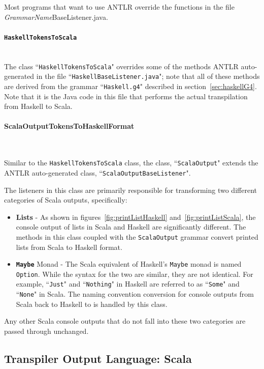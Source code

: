 \documentclass{report}
\newcommand{\myparagraph}[1]{\paragraph{#1}\mbox{}\\}
\begin{document}
Most programs that want to use ANTLR override the functions in the file \emph{GrammarName}BaseListener.java.


\myparagraph{\texttt{HaskellTokensToScala}}

The class ``\texttt{HaskellTokensToScala}" overrides some of the methods ANTLR auto-generated in the file ``\texttt{HaskellBaseListener.java}"; note that all of these methods are derived from the grammar ``\texttt{Haskell.g4}" described in section~\ref{sec:haskellG4}.  Note that it is the Java code in this file that performs the actual transpilation from Haskell to Scala.

\myparagraph{ScalaOutputTokensToHaskellFormat}\label{sec:scalaOutputFunctionality}

Similar to the \texttt{HaskellTokensToScala} class, the class, ``\texttt{ScalaOutput}" extends the ANTLR auto-generated class, ``\texttt{ScalaOutputBaseListener}".

The listeners in this class are primarily responsible for transforming two different categories of Scala outputs, specifically:

\begin{itemize}

\item \textbf{Lists} - As shown in figures~\ref{fig:printListHaskell} and~\ref{fig:printListScala}, the console output of lists in Scala and Haskell are significantly different.  The methods in this class coupled with the \texttt{ScalaOutput} grammar convert printed lists from Scala to Haskell format.

\item \textbf{\texttt{Maybe}} Monad - The Scala equivalent of Haskell's \texttt{Maybe} monad is named \texttt{Option}.  While the syntax for the two are similar, they are not identical.  For example, ``\texttt{Just}" and ``\texttt{Nothing}" in Haskell are referred to as ``\texttt{Some}" and ``\texttt{None}" in Scala.  The naming convention conversion for console outputs from Scala back to Haskell to is handled by this class.

\end{itemize}

Any other Scala console outputs that do not fall into these two categories are passed through unchanged.


\subsection{Transpiler Output Language: Scala}
\end{document}
